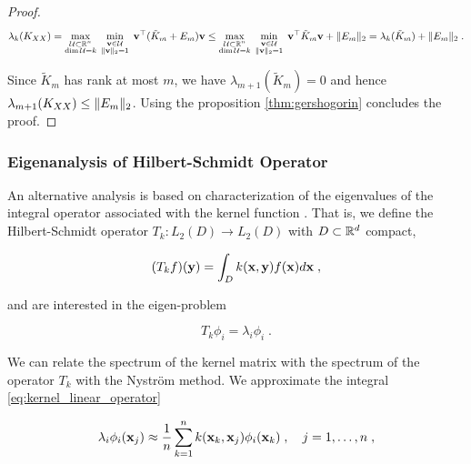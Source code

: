 \documentclass{article}
\begin{document}
{\begin{proof}
\begin{equation*}
    \lambda_{k}(K_{XX}) = 
    \max_{\substack{\mathcal U \subset \mathbb R^n \\ \dim \mathcal U = k}} \;
    \min_{\substack{\boldsymbol{\mathbf{v}} \in \mathcal U \\ \Vert \boldsymbol{\mathbf{v}} \Vert_2 = 1}} \;
    \boldsymbol{\mathbf{v}}^\top (\tilde K_m + E_m) \boldsymbol{\mathbf{v}} \le  
    \max_{\substack{\mathcal U \subset \mathbb R^n \\ \dim \mathcal U = k}} \;
    \min_{\substack{\boldsymbol{\mathbf{v}} \in \mathcal U \\ \Vert \boldsymbol{\mathbf{v}} \Vert_2 = 1}} \;
    \boldsymbol{\mathbf{v}}^\top \tilde K_m \boldsymbol{\mathbf{v}} + \Vert E_m \Vert_2 = \lambda_k(\tilde K_m) + \Vert E_m \Vert_2 \; .
\end{equation*}

Since $\tilde K_m$ has rank at most $m$, we have $\lambda_{m+1}(\tilde K_m) = 0$ and hence $\lambda_{m+1}(K_{XX}) \le \Vert E_m \Vert_2$. Using the proposition \ref{thm:gershogorin} concludes the proof. 
\end{proof}



\subsubsection{Eigenanalysis of Hilbert-Schmidt Operator} 

An alternative analysis is based on characterization of the eigenvalues of the integral operator associated with the kernel function \cite{banerjee_parallel_2013, pan_learning_2011, bach_kernel_2002}. That is, we define the Hilbert-Schmidt operator $T_k : L_2(D) \to L_2(D)$ with $D \subset \mathbb R^d$ compact,

\begin{equation} \label{eq:kernel_linear_operator}
    (T_k f)(\vect y) = \int_{D} k(\vect x, \vect y) f(\vect x)  d\vect x  \; ,%
\end{equation}

and are interested in the eigen-problem

\begin{equation*}
    T_k \phi_i = \lambda_i \phi_i \; .
\end{equation*}

We can relate the spectrum of the kernel matrix with the spectrum of the operator $T_k$ with the Nyström method. We approximate the integral  \eqref{eq:kernel_linear_operator}

\begin{equation} \label{eq:nystrom}
    \lambda_i \phi_i(\boldsymbol{\mathbf{x}}_j) \approx \frac{1}{n} \sum_{k=1}^n k(\boldsymbol{\mathbf{x}}_k, \boldsymbol{\mathbf{x}}_j) \phi_i(\boldsymbol{\mathbf{x}}_k) \; , 
    \quad j = 1, \ldots, n \; ,
\end{equation}

}
\end{document}
